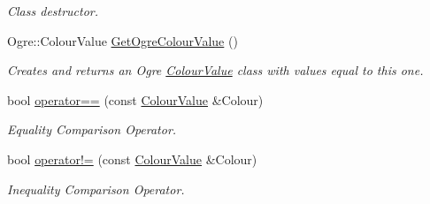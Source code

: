 \begin{DoxyCompactItemize}
\begin{DoxyCompactList}\small\item\em Class destructor. \item\end{DoxyCompactList}\item 
Ogre::ColourValue \hyperlink{classphys_1_1ColourValue_a7a2978ebc5a7e04e02279664f1ea4a86}{GetOgreColourValue} ()
\begin{DoxyCompactList}\small\item\em Creates and returns an Ogre \hyperlink{classphys_1_1ColourValue}{ColourValue} class with values equal to this one. \item\end{DoxyCompactList}\item 
bool \hyperlink{classphys_1_1ColourValue_a4615835cadb51c814ef87377ac2fbc8c}{operator==} (const \hyperlink{classphys_1_1ColourValue}{ColourValue} \&Colour)
\begin{DoxyCompactList}\small\item\em Equality Comparison Operator. \item\end{DoxyCompactList}\item 
bool \hyperlink{classphys_1_1ColourValue_a06b52ce51b723ea733f2b067b03530a5}{operator!=} (const \hyperlink{classphys_1_1ColourValue}{ColourValue} \&Colour)
\begin{DoxyCompactList}\small\item\em Inequality Comparison Operator. \item\end{DoxyCompactList}\end{DoxyCompactItemize}
